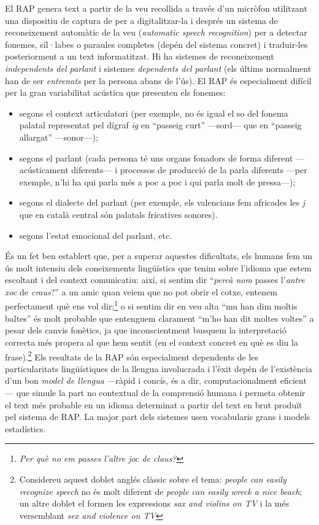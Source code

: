 El RAP genera text a partir de la veu recollida a través d'un micròfon
utilitzant una dispositiu de captura de  per a digitalitzar-la i després un
sistema de reconeixement automàtic de la veu (\emph{automatic
  speech recognition}) per a detectar fonemes, síl·labes o paraules
completes (depén del sistema concret) i traduir-les posteriorment
a un text informatitzat.  Hi ha sistemes de reconeixement {\em
  independents del parlant} i sistemes \emph{dependents del parlant}
(els últims normalment han de ser \emph{entrenats} per la persona abans
de l'ús).  El RAP és especialment difícil per la gran variabilitat
acústica que presenten els fonemes:
\begin{itemize}
\item segons el context articulatori (per exemple, no és igual el so del
fonema palatal representat pel dígraf \emph{ig}
en ``passeig curt'' ---sord--- que en ``passeig allargat''
---sonor---);
\item segons el parlant (cada persona té uns organs fonadors de forma
  diferent ---acústicament diferents---
  i processos de producció de la parla diferents ---per exemple, n'hi
  ha qui parla més a poc a poc i qui parla molt de pressa---);
\item segons el dialecte del parlant (per exemple, els valencians fem
  africades les \emph{j} que en català central són palatals fricatives
  sonores).
\item segons l'estat emocional del parlant, etc.
\end{itemize}
És un fet ben establert que, per a superar aquestes dificultats, els
humans fem un ús molt intensiu dels coneixements lingüístics que tenim
sobre l'idioma que estem escoltant i del context comunicatiu: així, si
sentim dir ``\emph{percà nom} passes l'\emph{antre xoc} de
\emph{craus}?'' a un amic quan veiem que no pot obrir el cotxe, entenem
perfectament què ens vol dir;\footnote{\emph{Per què no em passes
    l'altre joc de claus?}} o si sentim dir en veu alta ``mu han dim
moltis baltes'' és molt probable que entenguem clarament ``m'ho han
dit moltes voltes'' a pesar dels canvis fonètics, ja que
inconscientment busquem la interpretació correcta més propera al que
hem sentit (en el context concret en què es diu la
frase).\footnote{Considereu aquest doblet anglés clàssic sobre el
  tema: \emph{people can easily recognize speech} no és molt diferent
  de {\em people can easily wreck a nice beach}; un altre doblet el
  formen les expressions \emph{sax and violins on TV} i la més
  versemblant \emph{sex and violence on TV}} Els resultats de la RAP
són especialment dependents de les particularitats lingüístiques de la
llengua involucrada i l'èxit depén de l'existència d'un bon
\emph{model de llengua} ---ràpid i concís, és a dir, computacionalment
eficient--- que simule la part no contextual de la comprensió humana i
permeta obtenir el text més probable en un idioma determinat a partir
del text en brut produït pel sistema de RAP. La major part dels
sistemes usen vocabularis grans i models estadístics.


